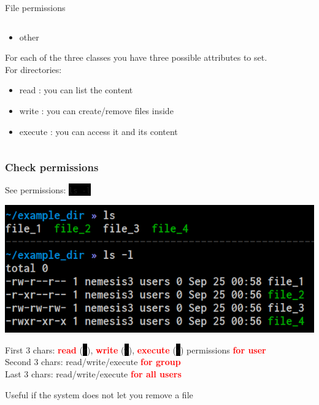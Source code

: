 \documentclass[unknownkeysallowed, 10pt, a4 paper, handout]{beamer}
\newcommand{\focus}[1]{\textbf{\textcolor{red}{#1}}}
\newcommand{\code}[1]{\colorbox{black}{\color{green}\texttt{#1}}}
\newcommand{\sidebyside}[5]{
  \begin{minipage}{#1\textwidth}
    #2
  \end{minipage} #3 \begin{minipage}{#4\textwidth}
    #5
  \end{minipage}
}
\begin{document}
\begin{frame}[label=permission]{File permissions}
\begin{columns}[T]
\begin{column}{.89\textwidth}
{\begin{itemize}
         \item other
      \end{itemize}
      For each of the three classes you have three possible attributes
      to set. \\
      \vspace{10pt}
      For directories:
      \begin{itemize}
         \item read : you can list the content
         \item write : you can create/remove files inside
         \item execute : you can access it and its content
      \end{itemize}
    }
    \end{column}
  \end{columns}
\end{frame}


\begin{frame}
  \begin{center}
    \frametitle{Check permissions}

    \sidebyside{0.44}{
      \centering
      See permissions: \code{ls -l}
    }{\hfill}{0.52}{
      \begin{center}
        \includegraphics[width=1.00\textwidth]{pics/ls-l.png}
      \end{center}
    }

    \vspace{8mm}

    First 3 chars: \focus{read} (\code{r}), \focus{write} (\code{w}), \focus{execute} (\code{x}) permissions \focus{for user}\\
    Second 3 chars: read/write/execute \focus{for group}\\
    Last 3 chars: read/write/execute \focus{for all users}

    \vspace{8mm}

    Useful if the system does not let you remove a file
  \end{center}
\end{frame}
\end{document}
